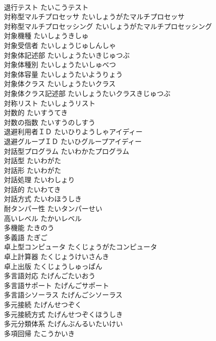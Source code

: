 \documentclass[8pt]{extreport}
\begin{document}
\begin{CJK}{UTF8}{min}
\\	退行テスト	たいこうテスト	
\\	対称型マルチプロセッサ	たいしょうがたマルチプロセッサ	
\\	対称型マルチプロセッシング	たいしょうがたマルチプロセッシング	
\\	対象機種	たいしょうきしゅ	
\\	対象受信者	たいしょうじゅしんしゃ	
\\	対象体記述部	たいしょうたいきじゅつぶ	
\\	対象体種別	たいしょうたいしゅべつ	
\\	対象体容量	たいしょうたいようりょう	
\\	対象体クラス	たいしょうたいクラス	
\\	対象体クラス記述部	たいしょうたいクラスきじゅつぶ	
\\	対称リスト	たいしょうリスト	
\\	対数的	たいすうてき	
\\	対数の指数	たいすうのしすう	
\\	退避利用者ＩＤ	たいひりようしゃアイディー	
\\	退避グループＩＤ	たいひグループアイディー	
\\	対話型プログラム	たいわかたプログラム	
\\	対話型	たいわがた	
\\	対話形	たいわがた	
\\	対話処理	たいわしょり	
\\	対話的	たいわてき	
\\	対話方式	たいわほうしき	
\\	耐タンパー性	たいタンパーせい	
\\	高いレベル	たかいレベル	
\\	多機能	たきのう	
\\	多義語	たぎご	
\\	卓上型コンピュータ	たくじょうがたコンピュータ	
\\	卓上計算器	たくじょうけいさんき	
\\	卓上出版	たくじょうしゅっぱん	
\\	多言語対応	たげんごたいおう	
\\	多言語サポート	たげんごサポート	
\\	多言語シソーラス	たげんごシソーラス	
\\	多元接続	たげんせつぞく	
\\	多元接続方式	たげんせつぞくほうしき	
\\	多元分類体系	たげんぶんるいたいけい	
\\	多項回帰	たこうかいき	

\end{CJK}
\end{document}
